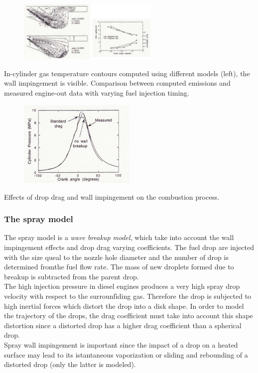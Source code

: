 \documentclass[12pt]{article}
\begin{document}
\begin{figure}[!ht]
\centering
\includegraphics[width=0.6\textwidth]{figures/kiva2.png}
\end{figure}

In-cylinder gas temperature contours computed using different models (left), the wall impingement is visible. Comparison between computed emissions and measured engine-out data with varying fuel injection timing.

\begin{figure}[!ht]
\centering
\includegraphics[width=0.5\textwidth]{figures/kiva3.png}
\end{figure}

Effects of drop drag and wall impingement on the combustion process.

\subsubsection{The spray model}

The spray model is a \textit{wave breakup model}, which take into account the wall impingement effects and drop drag varying coefficients. The fuel drop are injected with the size queal to the nozzle hole diameter and the number of drop is determined fromthe fuel flow rate. The mass of new droplets formed due to breakup is subtracted from the parent drop.\\
The high injection pressure in diesel engines produces a very high spray drop velocity with respect to the surrounfìding gas. Therefore the drop is subjected to high inertial forces which distort the drop into a disk shape. In order to model the trajectory of the drops, the drag coefficient must take into account this shape distortion since a distorted drop has a higher drag coefficient than a spherical drop.\\
Spray wall impingement is important since the impact of a drop on a heated surface may lead to its istantaneous vaporization or sliding and rebounding of a distorted drop (only the latter is modeled).
\end{document}

